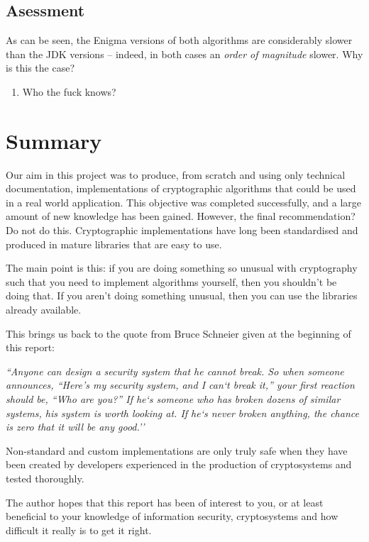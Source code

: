   \subsection{Asessment}
  
  As can be seen, the Enigma versions of both algorithms are considerably slower than the JDK versions -- indeed, in both cases an \emph{order of magnitude} slower. Why is this the case? 
  
  \begin{enumerate}
    \item Who the fuck knows?
  \end{enumerate}

\section{Summary}

Our aim in this project was to produce, from scratch and using only technical documentation, implementations of cryptographic algorithms that could be used in a real world application. This objective was completed successfully, and a large amount of new knowledge has been gained. However, the final recommendation? Do not do this. Cryptographic implementations have long been standardised and produced in mature libraries that are easy to use.

The main point is this: if you are doing something so unusual with cryptography such that you need to implement algorithms yourself, then you shouldn't be doing that. If you aren't doing something unusual, then you can use the libraries already available.

This brings us back to the quote from Bruce Schneier given at the beginning of this report: 

\textit{``Anyone can design a security system that he cannot break. So when someone announces, ``Here’s my security system, and I can`t break it,” your first reaction should be, “Who are you?” If he`s someone who has broken dozens of similar systems, his system is worth looking at. If he`s never broken anything, the chance is zero that it will be any good.''}

Non-standard and custom implementations are only truly safe when they have been created by developers experienced in the production of cryptosystems and tested thoroughly.

The author hopes that this report has been of interest to you, or at least beneficial to your knowledge of information security, cryptosystems and how difficult it really is to get it right.